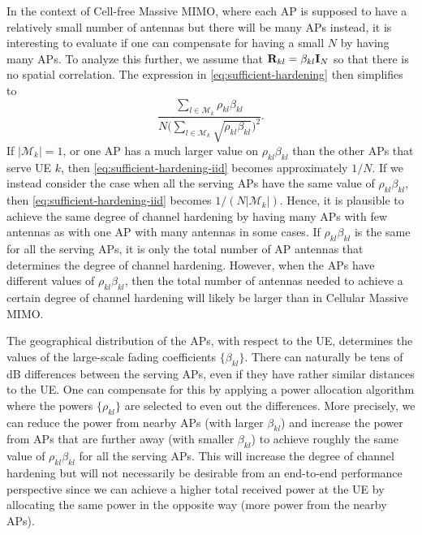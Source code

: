 In the context of Cell-free Massive MIMO, where each AP is supposed to have a relatively small number of antennas but there will be many APs instead, it is interesting to evaluate if one can compensate for having a small $N$ by having many APs.
To analyze this further, we assume that $\mathbf{R}_{kl} = \beta_{kl} \mathbf{I}_N$ so that there is no spatial correlation. The expression  in \eqref{eq:sufficient-hardening} then simplifies to
\begin{equation} \label{eq:sufficient-hardening-iid}
\frac{ \sum\limits_{l \in \mathcal{M}_k} \rho_{kl}  \beta_{kl} 
}{ N \bigg( \sum\limits_{l \in \mathcal{M}_k} \sqrt{\rho_{kl}  \beta_{kl}} 
\bigg)^2 } .
\end{equation}
If $|\mathcal{M}_k |=1$, or one AP has a much larger value on $\rho_{kl}  \beta_{kl} $ than the other APs that serve UE $k$, then \eqref{eq:sufficient-hardening-iid} becomes approximately $1/N$. If we instead consider the case when all the serving APs have the same value of $\rho_{kl}  \beta_{kl} $, then \eqref{eq:sufficient-hardening-iid} becomes $1/( N | \mathcal{M}_k|)$. Hence, it is plausible to achieve the same degree of channel hardening by having many APs with few antennas as with one AP with many antennas in some cases. If $\rho_{kl}  \beta_{kl} $ is the same for all the serving APs, it is only the total number of AP antennas that determines the degree of channel hardening.
However, when the APs have different values of  $\rho_{kl}  \beta_{kl} $, then the total number of antennas needed to achieve a certain degree of channel hardening will likely be larger than in Cellular Massive MIMO.

The geographical distribution of the APs, with respect to the UE, determines the values of the large-scale fading coefficients $\{ \beta_{kl} \}$. There can naturally be tens of dB differences between the serving APs, even if they have rather similar distances to the UE.
One can compensate for this by applying a power allocation algorithm where the powers $\{\rho_{kl} \}$ are selected to even out the differences. More precisely, we can reduce the power from nearby APs (with larger $\beta_{kl}$) and increase the power from APs that are further away  (with smaller $\beta_{kl}$) to achieve roughly the same value of $\rho_{kl}  \beta_{kl} $ for all the serving APs. This will increase the degree of channel hardening but will not necessarily be desirable from an end-to-end performance perspective since we can achieve a higher total received power at the UE by allocating the same power in the opposite way (more power from the nearby APs).

